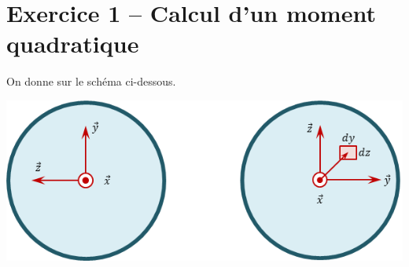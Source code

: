 \documentclass[10pt,fleqn]{article} %
\begin{document}

\vspace{10cm}
\pagestyle{fancy}
\thispagestyle{plain}


\def\columnseprulecolor{\color{ocre}}
\setlength{\columnseprule}{0.4pt} 


\section*{Exercice 1 -- Calcul d'un moment quadratique}
\setcounter{subparagraph}{0}
On donne sur le schéma ci-dessous.
\begin{center}
\includegraphics[width=.45\textwidth]{images/fig_01}
\end{center}
\end{document}
